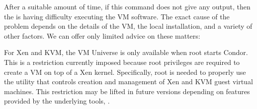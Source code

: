 After a suitable amount of time, if this command does not give any output,
then the  is having difficulty executing the VM software.
The exact cause of the problem depends on the details of the VM, the local 
installation, and a variety of other factors. We can offer only limited 
advice on these matters:

For Xen and KVM, the VM Universe is only available when root starts Condor.
This is a restriction currently imposed because root privileges are 
required to create a VM on top of a Xen kernel. Specifically, root is needed 
to properly use the  utility that controls 
creation and management of Xen and KVM guest virtual machines. This restriction 
may be lifted in future versions depending on features provided by the 
underlying tools, .
